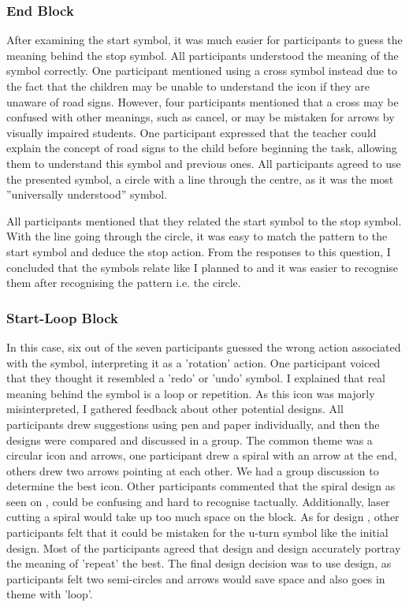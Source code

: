 \documentclass[oneside,%
                    author={Malak Hajji},
                    degree={BSc},
                    title={Designing An Accessible Computational Toolkit For Students},
                  subtitle={With Mixed Visual Abilities}]{dissertation}
\begin{document}
\subsubsection{End Block}
After examining the start symbol, it was much easier for participants to guess the meaning behind the stop symbol. All participants understood the meaning of the symbol correctly. One participant mentioned using a cross symbol instead due to the fact that the children may be unable to understand the icon if they are unaware of road signs. However, four participants mentioned that a cross may be confused with other meanings, such as cancel, or may be mistaken for arrows by visually impaired students. One participant expressed that the teacher could explain the concept of road signs to the child before beginning the task, allowing them to understand this symbol and previous ones. All participants agreed to use the presented symbol, a circle with a line through the centre, as it was the most ”universally understood” symbol. 

All participants mentioned that they related the start symbol to the stop symbol. With the line going through the circle, it was easy to match the pattern to the start symbol and deduce the stop action. From the responses to this question, I concluded that the symbols relate like I planned to and it was easier to recognise them after recognising the pattern i.e. the circle. 

\subsubsection{Start-Loop Block}
In this case, six out of the seven participants guessed the wrong  action associated with the symbol, interpreting it as a 'rotation' action. One participant voiced that they thought it resembled a 'redo' or 'undo' symbol. I explained that real meaning behind the symbol is a loop or repetition. As this icon was majorly misinterpreted, I gathered feedback about other potential designs. All participants drew suggestions using pen and paper individually, and then the designs were compared and discussed in a group. The common theme was a circular icon and arrows, one participant drew a spiral with an arrow at the end, others drew two arrows pointing at each other. We had a group discussion to determine the best icon. Other participants commented that the spiral design as seen on , could be confusing and hard to recognise tactually. Additionally, laser cutting a spiral would take up too much space on the block. As for design , other participants felt that it could be mistaken for the u-turn symbol like the initial design. Most of the participants agreed that design and design accurately portray the meaning of 'repeat' the best. The final design decision was to use design, as participants felt two semi-circles and arrows would save space and also goes in theme with 'loop'. 
\end{document}
